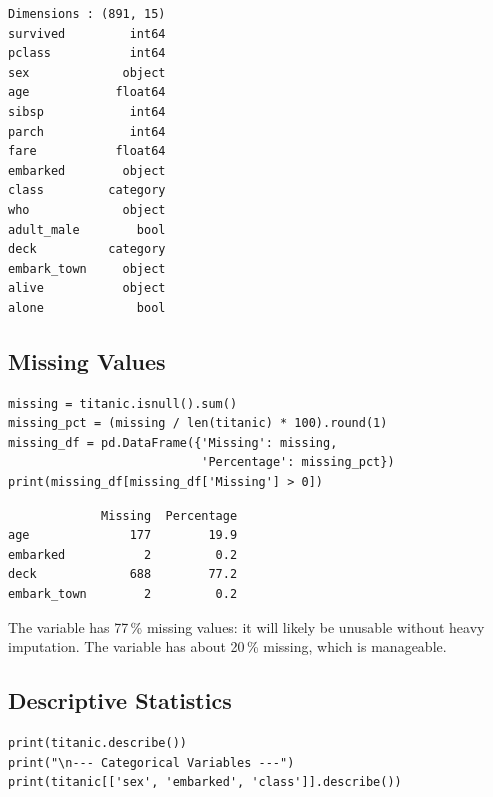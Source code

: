 \begin{codeoutput}
\begin{verbatim}
Dimensions : (891, 15)
survived         int64
pclass           int64
sex             object
age            float64
sibsp            int64
parch            int64
fare           float64
embarked        object
class         category
who             object
adult_male        bool
deck          category
embark_town     object
alive           object
alone             bool
\end{verbatim}
\end{codeoutput}

\subsection{Missing Values}

\begin{codeblock}[title=\textbf{Python}]
\begin{verbatim}
missing = titanic.isnull().sum()
missing_pct = (missing / len(titanic) * 100).round(1)
missing_df = pd.DataFrame({'Missing': missing,
                           'Percentage': missing_pct})
print(missing_df[missing_df['Missing'] > 0])
\end{verbatim}
\end{codeblock}

\begin{codeoutput}
\begin{verbatim}
             Missing  Percentage
age              177        19.9
embarked           2         0.2
deck             688        77.2
embark_town        2         0.2
\end{verbatim}
\end{codeoutput}

\begin{remark}
The variable  has 77\,\% missing values: it will likely be unusable without heavy imputation. The variable  has about 20\,\% missing, which is manageable.
\end{remark}

\subsection{Descriptive Statistics}

\begin{codeblock}[title=\textbf{Python}]
\begin{verbatim}
print(titanic.describe())
print("\n--- Categorical Variables ---")
print(titanic[['sex', 'embarked', 'class']].describe())
\end{verbatim}
\end{codeblock}

